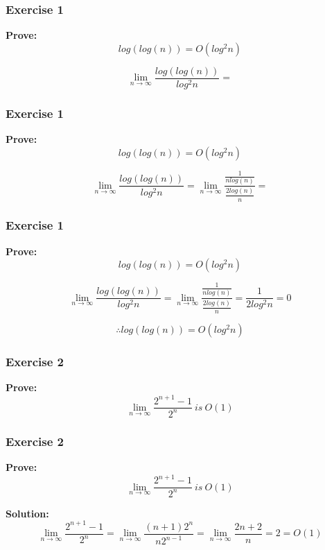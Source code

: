 \documentclass{beamer}
\begin{document}
\begin{frame}[noframenumbering]
\frametitle{Exercise 1}
\textbf{Prove:} $$log(log(n))=O(log^{2}n)$$

 
  $$\lim_{n \to \infty} \frac{log(log(n))}{log^{2}n}= $$
 
\end{frame}

\begin{frame}[noframenumbering]
\frametitle{Exercise 1}
\textbf{Prove:} $$log(log(n))=O(log^{2}n)$$

 
  $$\lim_{n \to \infty} \frac{log(log(n))}{log^{2}n}=\lim_{n \to \infty} \frac{\frac{1}{nlog(n)}}{\frac{2log(n)}{n}}=  $$

\end{frame}

 \begin{frame}[noframenumbering]
 \frametitle{Exercise 1}
\textbf{Prove:} $$log(log(n))=O(log^{2}n)$$

 
  $$\lim_{n \to \infty} \frac{log(log(n))}{log^{2}n}=\lim_{n \to \infty} \frac{\frac{1}{nlog(n)}}{\frac{2log(n)}{n}} = \frac{1}{2log^{2}n}=0$$
 

$$\therefore log(log(n))=O(log^{2}n)$$
 
\end{frame}

\begin{frame} 
 \frametitle{Exercise 2}
\textbf{Prove:}  $$\lim_{n \to \infty}    \frac{2^{n+1} - 1}{2^{n}}  \ is \  O(1)$$   
\end{frame}

\begin{frame}[noframenumbering]
 \frametitle{Exercise 2}
\textbf{Prove:}  $$\lim_{n \to \infty}    \frac{2^{n+1} - 1}{2^{n}}  \ is \  O(1)$$  

\textbf{Solution:}  $$\lim_{n \to \infty}    \frac{2^{n+1} - 1}{2^{n}} =\lim_{n \to \infty}   \frac{(n+1)2^{n}}{n2^{n-1}}=\lim_{n \to \infty}   \frac{2n+2}{n}=2 = O(1) $$\end{frame}
\end{document}
